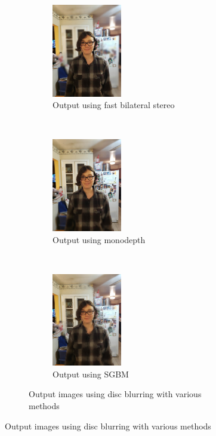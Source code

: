 \documentclass[10pt,twocolumn,letterpaper]{article}
\begin{document}
\begin{figure}[t!]
    \begin{subfigure}[t!]{\textwidth}
        \centering
        \begin{subfigure}[t]{0.33\textwidth}
            \centering
            \includegraphics[width=1.2in]{bin/output_FBIL.jpg}
            \caption{Output using fast bilateral stereo}
        \end{subfigure}%
        ~
        \begin{subfigure}[t]{0.33\textwidth}
            \centering
            \includegraphics[width=1.2in]{bin/output_monodepth.jpg}
            \caption{Output using monodepth}
        \end{subfigure}%
        ~
        \begin{subfigure}[t]{0.33\textwidth}
            \centering
            \includegraphics[width=1.2in]{bin/output_SGBM.jpg}
            \caption{Output using SGBM}
        \end{subfigure}
        \caption*{Output images using disc blurring with various methods}
    \end{subfigure}


\end{figure}
\end{document}
